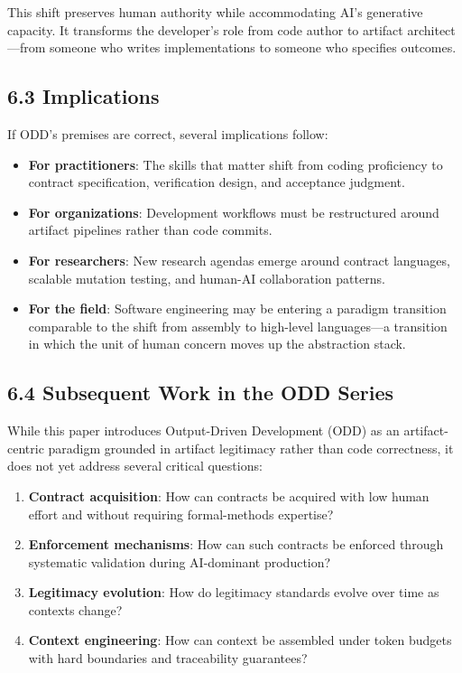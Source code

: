 \documentclass[
]{article}
\begin{document}
This shift preserves human authority while accommodating AI's generative
capacity. It transforms the developer's role from code author to
artifact architect---from someone who writes implementations to someone
who specifies outcomes.

\hypertarget{63-implications}{%
\subsection{6.3 Implications}\label{63-implications}}

If ODD's premises are correct, several implications follow:

\begin{itemize}
\item
  \textbf{For practitioners}: The skills that matter shift from coding
  proficiency to contract specification, verification design, and
  acceptance judgment.
\item
  \textbf{For organizations}: Development workflows must be restructured
  around artifact pipelines rather than code commits.
\item
  \textbf{For researchers}: New research agendas emerge around contract
  languages, scalable mutation testing, and human-AI collaboration
  patterns.
\item
  \textbf{For the field}: Software engineering may be entering a
  paradigm transition comparable to the shift from assembly to
  high-level languages---a transition in which the unit of human concern
  moves up the abstraction stack.
\end{itemize}

\hypertarget{64-subsequent-work-in-the-odd-series}{%
\subsection{6.4 Subsequent Work in the ODD
Series}\label{64-subsequent-work-in-the-odd-series}}

While this paper introduces Output-Driven Development (ODD) as an
artifact-centric paradigm grounded in artifact legitimacy rather than
code correctness, it does not yet address several critical questions:

\begin{enumerate}
\def\labelenumi{\arabic{enumi}.}
\item
  \textbf{Contract acquisition}: How can contracts be acquired with low
  human effort and without requiring formal-methods expertise?
\item
  \textbf{Enforcement mechanisms}: How can such contracts be enforced
  through systematic validation during AI-dominant production?
\item
  \textbf{Legitimacy evolution}: How do legitimacy standards evolve over
  time as contexts change?
\item
  \textbf{Context engineering}: How can context be assembled under token
  budgets with hard boundaries and traceability guarantees?
\end{enumerate}
\end{document}
